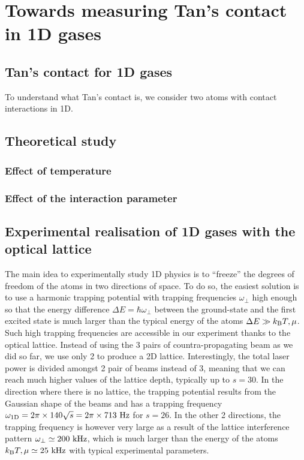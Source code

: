 \chapter{Towards measuring Tan's contact in 1D gases}

\section{Tan's contact for 1D gases}

To understand what Tan's contact is, we consider two atoms with contact interactions in 1D. 

\section{Theoretical study}

\subsection{Effect of temperature}

\subsection{Effect of the interaction parameter}

\section{Experimental realisation of 1D gases with the optical lattice}

The main idea to experimentally study 1D physics is to ``freeze'' the degrees of freedom of the atoms in two directions of space. To do so, the easiest solution is to use a harmonic trapping potential with trapping frequencies $\omega_{\perp}$ high enough so that the energy difference $\Delta E =\hbar \omega_{\perp}$ between the ground-state and the first excited state is much larger than the typical energy of the atoms $\Delta E \gg k_{\mathrm{B}} T, \mu$. Such high trapping frequencies are accessible in our experiment thanks to the optical lattice. Instead of using the 3 pairs of countra-propagating beam as we did so far, we use only 2 to produce a 2D lattice. Interestingly, the total laser power is divided amongst 2 pair of beams instead of 3, meaning that we can reach much higher values of the lattice depth, typically up to $s=30$. In the direction where there is no lattice, the trapping potential results from the Gaussian shape of the beams and has a trapping frequency $\omega_{\rm{1D}} =2 \pi \times 140 \sqrt{s} = 2 \pi  \times 713 \ \rm{Hz}$ for $s=26$. In the other 2 directions, the trapping frequency is however very large as a result of the lattice interference pattern $\omega_{\perp} \simeq 200 \ \rm{kHz}$, which is much larger than the energy of the atoms $k_{\mathrm{B}} T, \mu \simeq 25 \ \rm{kHz}$ with typical experimental parameters.

